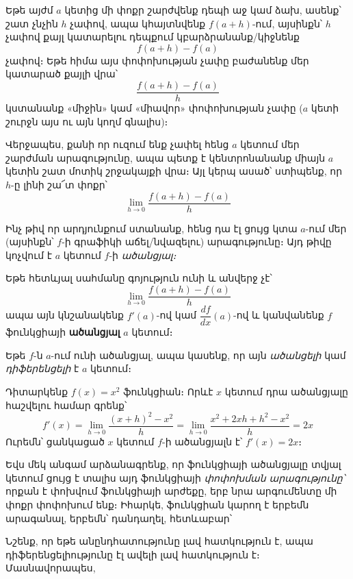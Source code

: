 Եթե այժմ $a$ կետից մի փոքր շարժվենք դեպի աջ կամ ձախ, ասենք՝ շատ չնչին $h$ չափով, ապա կհայտնվենք $f(a+h)$-ում, այսինքն՝ $h$ չափով քայլ կատարելու դեպքում կբարձրանանք/կիջնենք 
\[
f(a+h) - f(a)
\]
չափով։ Եթե հիմա այս փոփոխության չափը բաժանենք մեր կատարած քայլի վրա՝
\[
\frac{f(a+h) - f(a)}{h}
\]
կստանանք «միջին» կամ «միավոր» փոփոխության չափը ($a$ կետի շուրջն այս ու այն կողմ գնալիս)։

Վերջապես, քանի որ ուզում ենք չափել հենց $a$ կետում մեր շարժման արագությունը, ապա պետք է կենտրոնանանք միայն $a$ կետին շատ մոտիկ շրջակայքի վրա։ Այլ կերպ ասած՝ ստիպենք, որ $h$-ը լինի շա՜տ փոքր՝
\[
\lim_{h\to 0} \frac{f(a+h) - f(a)}{h}
\]

Ինչ թիվ որ արդյունքում ստանանք, հենց դա էլ ցույց կտա $a$-ում մեր (այսինքն՝ $f$-ի գրաֆիկի աճել/նվազելու) արագությունը։ Այդ թիվը կոչվում է $a$ կետում $f$-ի \textit{ածանցյալ։}

\begin{definition}
Եթե հետևյալ սահմանը գոյություն ունի և անվերջ չէ՝
\[
\lim_{h \to 0} \frac{f(a + h) - f(a)}{h}
\]
ապա այն կնշանակենք $f'(a)$-ով կամ $\dfrac{df}{dx}(a)$-ով և կանվանենք $f$ ֆունկցիայի \textbf{ածանցյալ} $a$ կետում։
\end{definition}

Եթե $f$-ն $a$-ում ունի ածանցյալ, ապա կասենք, որ այն \textit{ածանցելի} կամ \textit{դիֆերենցելի} է $a$ կետում։

\begin{example}
Դիտարկենք $f(x) = x^2$ ֆունկցիան։ Որևէ $x$ կետում դրա ածանցյալը հաշվելու համար գրենք՝
\[
f'(x) = \lim\limits_{{h \to 0}} \frac{(x + h)^2 - x^2}{h} =  \lim\limits_{{h \to 0}} \frac{x^2+2xh+h^2 - x^2}{h} = 2x
\]
Ուրեմն՝ ցանկացած $x$ կետում $f$-ի ածանցյալն է՝ $f'(x) = 2x$։
\end{example}

Եվս մեկ անգամ արձանագրենք, որ ֆունկցիայի ածանցյալը տվյալ կետում ցույց է տալիս այդ ֆունկցիայի \textit{փոփոխման արագությունը՝} որքան է փոխվում ֆունկցիայի արժեքը, երբ նրա արգումենտը մի փոքր փոփոխում ենք։ Իհարկե, ֆունկցիան կարող է երբեմն արագանալ, երբեմն՝ դանդաղել, հետևաբար՝

Նշենք, որ եթե անընդհատությունը լավ հատկություն է, ապա դիֆերեն\-ցելիությունը էլ ավելի լավ հատկություն է։ Մասնավորապես,

